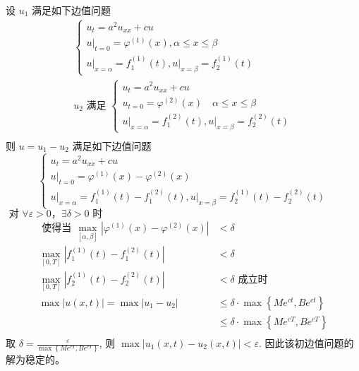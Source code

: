 \begin{questions}
\begin{solution}
设 $u_1$ 满足如下边值问题
$$
\begin{array}{l}
\left\{\begin{array}{l}
u_{t}=a^{2} u_{x x}+c u \\
\left.u\right|_{t=0}=\varphi^{(1)}(x), \alpha \leq x \leq \beta \\
\left.u\right|_{x=\alpha}=f_{1}^{(1)}(t),\left.u\right|_{x=\beta}=f_{2}^{(1)}(t)
\end{array}\right. \\
u_{2} \text { 满足 }\left\{\begin{array}{l}
u_{t}=a^{2} u_{x x}+c u \\
u_{t=0}=\varphi^{(2)}(x) \quad \alpha \leqslant x \leqslant \beta \\
\left.u\right|_{x=\alpha}=f_{1}^{(2)}(t),\left.u\right|_{x=\beta}=f_{2}^{(2)}(t)
\end{array}\right. \\
\end{array}
$$
则 $u=u_{1}-u_{2}$ 满足如下边值问题
$$
\left\{\begin{array}{l}
u_{t}=a^{2} u_{x x}+c u \\
\left.u\right|_{t=0}=\varphi^{(1)}(x)-\varphi^{(2)}(x) \\
\left.u\right|_{x=\alpha}=f_{1}^{(1)}(t)-f_{1}^{(2)}(t),\left.u\right|_{x=\beta}=f_{2}^{(1)}(t)-f_{2}^{(2)}(t)
\end{array}\right.
$$
$\text { 对 } \forall \varepsilon>0 ， \exists \delta>0 \text { 时 }$
$$
\begin{aligned}
\text { 使得当 } \max _{[\alpha, \beta]}\left|\varphi^{(1)}(x)-\varphi^{(2)}(x)\right| & <\delta \\
\max _{[0, T]}\left|f_{1}^{(1)}(t)-f_{1}^{(2)}(t)\right| & <\delta \\
\max _{[0, T]}\left|f_{2}^{(1)}(t)-f_{2}^{(2)}(t)\right| & <\delta \text { 成立时 } \\
\max |u(x, t)|=\max \left|u_{1}-u_{2}\right| & \leqslant \delta \cdot \max \left\{M e^{c t}, B e^{c t}\right\} \\
& \leqslant \delta \cdot \max \left\{M e^{c T}, B e^{c T}\right\} \\
\end{aligned}
$$
 取 
$\delta  =\frac{\varepsilon}{\max \left\{M e^{c T}, B e^{c T}\right\}}$,
则 $ \max \left|u_{1}(x, t)-u_{2}(x, t)\right|<\varepsilon $.
因此该初边值问题的解为稳定的。
\end{solution}



\end{questions}
